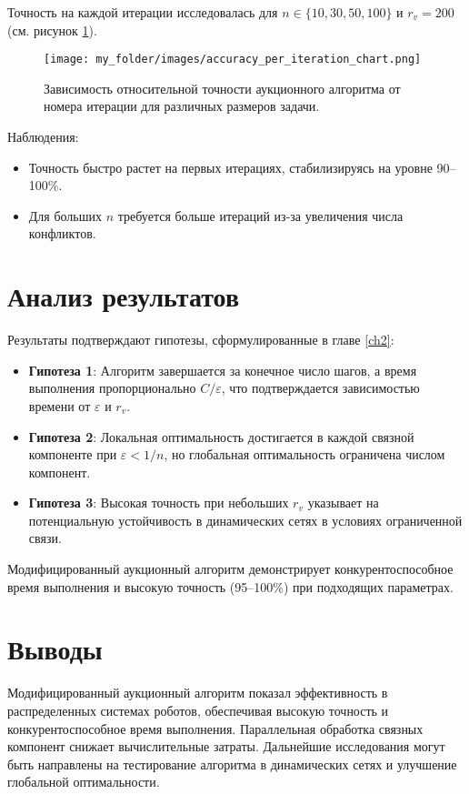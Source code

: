 Точность на каждой итерации исследовалась для \( n \in \{10, 30, 50, 100\} \) и \( r_v = 200 \) (см. рисунок \ref{fig:acc_per_iteration_chart}).

\begin{figure}[h]
    \centering
    \texttt{[image: my\_folder/images/accuracy\_per\_iteration\_chart.png]}
    \caption{Зависимость относительной точности аукционного алгоритма от номера итерации для различных размеров задачи.}
    \label{fig:acc_per_iteration_chart}
\end{figure}

Наблюдения:
\begin{itemize}
    \item Точность быстро растет на первых итерациях, стабилизируясь на уровне 90--100\%.
    \item Для больших \( n \) требуется больше итераций из-за увеличения числа конфликтов.
\end{itemize}

\section{Анализ результатов}

Результаты подтверждают гипотезы, сформулированные в главе \ref{ch2}:

\begin{itemize}
    \item \textbf{Гипотеза 1}: Алгоритм завершается за конечное число шагов, а время выполнения пропорционально \( C / \varepsilon \), что подтверждается зависимостью времени от \( \varepsilon \) и \( r_v \).
    \item \textbf{Гипотеза 2}: Локальная оптимальность достигается в каждой связной компоненте при \( \varepsilon < 1/n \), но глобальная оптимальность ограничена числом компонент.
    \item \textbf{Гипотеза 3}: Высокая точность при небольших \( r_v \) указывает на потенциальную устойчивость в динамических сетях в условиях ограниченной связи.
\end{itemize}

Модифицированный аукционный алгоритм демонстрирует конкурентоспособное время выполнения и высокую точность (95--100\%) при подходящих параметрах.



\section{Выводы}

Модифицированный аукционный алгоритм показал эффективность в распределенных системах роботов, обеспечивая высокую точность и конкурентоспособное время выполнения. Параллельная обработка связных компонент снижает вычислительные затраты. Дальнейшие исследования могут быть направлены на тестирование алгоритма в динамических сетях и улучшение глобальной оптимальности.